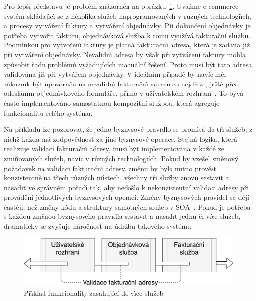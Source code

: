 Pro lepší představu je problém znázorněn na obrázku~\ref{fig:service-cutting}. Uvažme e-commerce
systém skládaj\'{\i}c\'{\i} se z několika služeb naprogramovan\'ych v různ\'ych technologi\'{\i}ch, a
procesy vytváření faktury a vytváření objednávky. Při dokončení objednávky je potřeba vytvořit fakturu,
objednávková služba k tomu využívá fakturační službu. Podmínkou pro vytvořen\'{\i} faktury je platná fakturačn\'{\i} adresa,
která je zadána již při vytváření objednávky. Nevalidn\'{\i} adresa by však při vytváření faktury
mohla způsobit řadu problémů vyžadujících manuální řešení. Proto musí být tato adresa validována
již při vytvářen\'{\i} objednávky. V ideáln\'{\i}m př\'{\i}padě by navíc měl zákazn\'{\i}k být upozorněn
na nevalidn\'{\i} fakturačn\'{\i} adresu co nejdříve, ještě před odeslán\'{\i}m objednávkového formuláře,
př\'{\i}mo v uživatelském rozhran\'{\i}~\cite{cemus2017separation}. To bývá často implementováno samostatnou
kompozitní službou, která agreguje funkcionalitu celého systému.

Na příkladu lze pozorovat, že jedno byznysové pravidlo se prom\'{\i}tá
do tř\'{\i} služeb, z nichž každá má zodpovědnost za jiné byznysové operace.
Stejná logika, která realizuje validaci fakturačn\'{\i} adresy,
mus\'{\i} b\'yt implementována v každé ze zmiňovaných služeb, navíc v různých technologiích.
Pokud by vzešel změnový požadavek na validaci fakturačn\'{\i} adresy, změnu by bylo nutno
provést konzistentně na třech různ\'ych m\'{\i}stech, všechny tři služby znovu
sestavit a nasadit ve správném pořad\'{\i} tak, aby nedošlo k nekonzistentní validaci adresy
při provádění jednotlivých byznysových operací. Změny byznysových pravidel se dějí častěji,
než změny kódu a struktury samotných služeb v \gls{SOA}~\cite{rosenberg2005business}.
Pokud je potřeba s každou změnou byznysového pravidla sestavit a nasadit jednu či více služeb,
dramaticky se zvyšuje náročnost na údržbu takového systému.

\begin{figure}
    \centering
    \includegraphics[keepaspectratio=true, width=0.7\linewidth]{figures/service-cutting.pdf}
    \caption{Př\'{\i}klad funkcionality zasahující do v\'{\i}ce služeb}
    \label{fig:service-cutting}
\end{figure}

